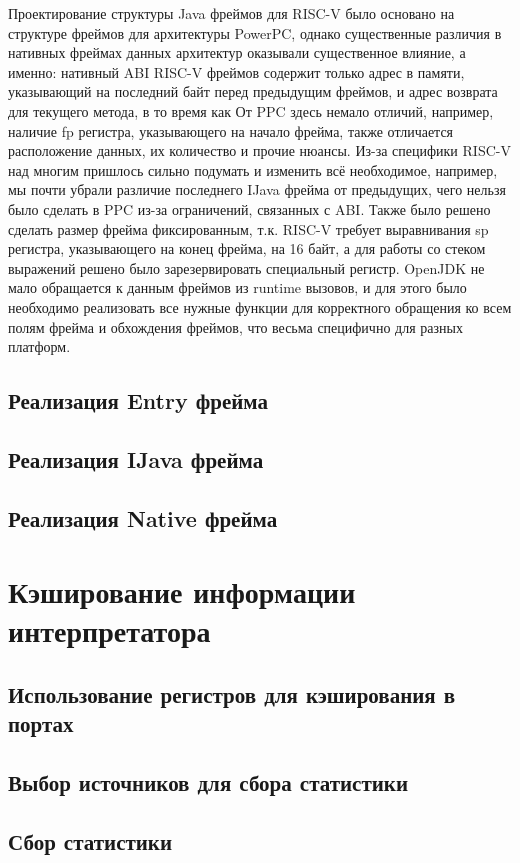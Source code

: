 \documentclass[14pt]{spbau-diploma}
\begin{document}
Проектирование структуры Java фреймов для RISC-V было основано на структуре фреймов для архитектуры PowerPC, однако существенные различия в нативных фреймах данных архитектур оказывали существенное влияние, а именно: нативный ABI RISC-V фреймов содержит только адрес в памяти, указывающий на последний байт перед предыдущим фреймов, и адрес возврата для текущего метода, в то время как 
От PPC здесь немало отличий, например, наличие fp регистра, указывающего на начало фрейма, также отличается расположение данных, их количество и прочие нюансы. 
Из-за специфики RISC-V над многим пришлось сильно подумать и изменить всё необходимое, например, мы почти убрали различие последнего IJava фрейма от предыдущих, чего нельзя было сделать в PPC из-за ограничений, связанных с ABI. Также было решено сделать размер фрейма фиксированным, т.к. RISC-V требует выравнивания sp регистра, указывающего на конец фрейма, на 16 байт, а для работы со стеком выражений решено было зарезервировать специальный регистр.
OpenJDK не мало обращается к данным фреймов из runtime вызовов, и для этого было необходимо реализовать все нужные функции для корректного обращения ко всем полям фрейма и обхождения фреймов, что весьма специфично для разных платформ. 


\subsection{Реализация Entry фрейма}
\subsection{Реализация IJava фрейма}
\subsection{Реализация Native фрейма}

\section{Кэширование информации интерпретатора}
\subsection{Использование регистров для кэширования в портах}
\subsection{Выбор источников для сбора статистики}
\subsection{Сбор статистики}
\end{document}
